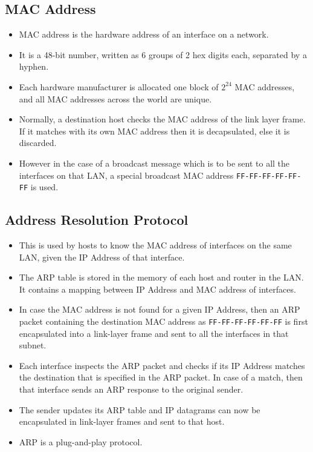 \documentclass[a4paper]{article}
\theoremstyle{plain}
\theoremstyle{definition}
\begin{document}
\subsection{MAC Address}
\begin{itemize}
    \item MAC address is the hardware address of an interface on a network. 
    
    \item It is a 48-bit number, written as 6 groups of 2 hex digits each, separated by a hyphen. 
    
    \item Each hardware manufacturer is allocated one block of $2^{24}$ MAC addresses, and all MAC addresses across the world are unique. 
    
    \item Normally, a destination host checks the MAC address of the link layer frame. If it matches with its own MAC address then it is decapsulated, else it is discarded. 
    
    \item However in the case of a broadcast message which is to be sent to all the interfaces on that LAN, a special broadcast MAC address \texttt{FF-FF-FF-FF-FF-FF} is used. 
\end{itemize}

\subsection{Address Resolution Protocol}
\begin{itemize}
    \item This is used by hosts to know the MAC address of interfaces on the same LAN, given the IP Address of that interface. 
    
    \item The ARP table is stored in the memory of each host and router in the LAN. It contains a mapping between IP Address and MAC address of interfaces. 
    
    \item In case the MAC address is not found for a given IP Address, then an ARP packet containing the destination MAC address as \texttt{FF-FF-FF-FF-FF-FF} is first encapsulated into a link-layer frame and sent to all the interfaces in that subnet. 
    
    \item Each interface inspects the ARP packet and checks if its IP Address matches the destination that is specified in the ARP packet. In case of a match, then that interface sends an ARP response to the original sender. 
    
    \item The sender updates its ARP table and IP datagrams can now be encapsulated in link-layer frames and sent to that host. 
    
    \item ARP is a plug-and-play protocol. 
\end{itemize}
\end{document}
